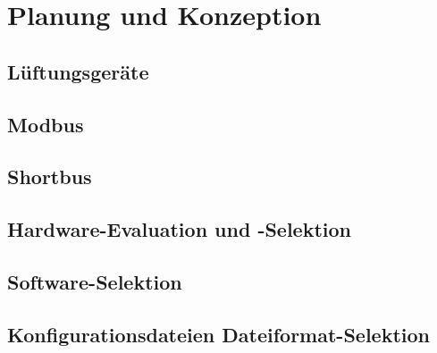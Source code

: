 \ifoot{\fenkart}
\chapter{Planung und Konzeption}
\section{Lüftungsgeräte}


\newpage
\ifoot{\schneider}
\section{Modbus}


\newpage
\ifoot{\fenkart}
\section{Shortbus}


\newpage
\ifoot{\mangeng}
\section{Hardware-Evaluation und -Selektion}



\newpage
\ifoot{\schneider}
\section{Software-Selektion}



\newpage
\ifoot{\pezze}


\newpage
\ifoot{\pezze}
\section{Konfigurationsdateien Dateiformat-Selektion}

